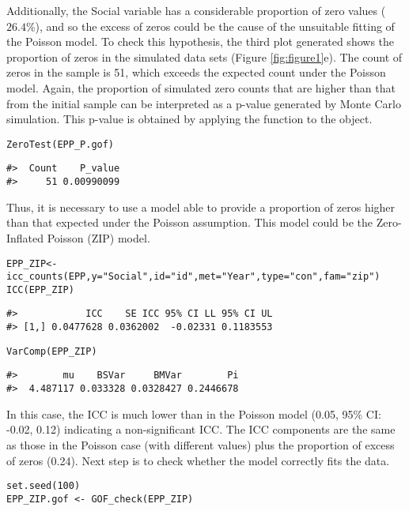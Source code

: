 Additionally, the Social variable has a considerable proportion of zero values (\(26.4\%\)), and so the excess of zeros could be the cause of the unsuitable fitting of the Poisson model. To check this hypothesis, the third plot generated shows the proportion of zeros in the simulated data sets (Figure \ref{fig:figure1}e). The count of zeros in the sample is 51, which exceeds the expected count under the Poisson model. Again, the proportion of simulated zero counts that are higher than that from the initial sample can be interpreted as a p-value generated by Monte Carlo simulation. This p-value is obtained by applying the function  to the  object.

\begin{verbatim}
ZeroTest(EPP_P.gof)
\end{verbatim}

\begin{verbatim}
#>  Count    P_value
#>     51 0.00990099
\end{verbatim}

Thus, it is necessary to use a model able to provide a proportion of zeros higher than that expected under the Poisson assumption. This model could be the Zero-Inflated Poisson (ZIP) model.

\begin{verbatim}
EPP_ZIP<-icc_counts(EPP,y="Social",id="id",met="Year",type="con",fam="zip")
ICC(EPP_ZIP)
\end{verbatim}

\begin{verbatim}
#>            ICC    SE ICC 95% CI LL 95% CI UL
#> [1,] 0.0477628 0.0362002  -0.02331 0.1183553
\end{verbatim}

\begin{verbatim}
VarComp(EPP_ZIP)
\end{verbatim}

\begin{verbatim}
#>        mu    BSVar     BMVar        Pi
#>  4.487117 0.033328 0.0328427 0.2446678
\end{verbatim}

In this case, the ICC is much lower than in the Poisson model (0.05, 95\% CI: -0.02, 0.12) indicating a non-significant ICC. The ICC components are the same as those in the Poisson case (with different values) plus the proportion of excess of zeros (0.24). Next step is to check whether the model correctly fits the data.

\begin{verbatim}
set.seed(100)
EPP_ZIP.gof <- GOF_check(EPP_ZIP)
\end{verbatim}


